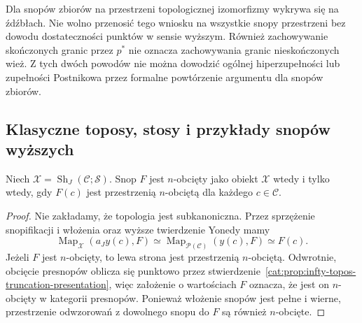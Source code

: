 \begin{uwaga}\label{cat:rem:infty-topos-stalk-caution}
Dla snopów zbiorów na przestrzeni topologicznej izomorfizmy wykrywa się na źdźbłach. Nie wolno przenosić tego wniosku na wszystkie snopy przestrzeni bez dowodu dostateczności punktów w sensie wyższym. Również zachowywanie skończonych granic przez $p^*$ nie oznacza zachowywania granic nieskończonych wież. Z tych dwóch powodów nie można dowodzić ogólnej hiperzupełności lub zupełności Postnikowa przez formalne powtórzenie argumentu dla snopów zbiorów.
\end{uwaga}

\subsection{Klasyczne toposy, stosy i przykłady snopów wyższych}

\begin{stwierdzenie}\label{cat:prop:infty-topos-sheaf-truncated-values}
Niech $\mathcal X=\operatorname{Sh}_J(\mathcal C;\mathcal S)$. Snop $F$ jest $n$-obcięty jako obiekt $\mathcal X$ wtedy i tylko wtedy, gdy $F(c)$ jest przestrzenią $n$-obciętą dla każdego $c\in\mathcal C$.
\end{stwierdzenie}
\begin{proof}
Nie zakładamy, że topologia jest subkanoniczna. Przez sprzężenie snopifikacji i włożenia oraz wyższe twierdzenie Yonedy mamy
\[
 \operatorname{Map}_{\mathcal X}(a_J y(c),F)
 \simeq\operatorname{Map}_{\mathcal P(\mathcal C)}(y(c),F)
 \simeq F(c).
\]
Jeżeli $F$ jest $n$-obcięty, to lewa strona jest przestrzenią $n$-obciętą. Odwrotnie, obcięcie presnopów oblicza się punktowo przez stwierdzenie~\ref{cat:prop:infty-topos-truncation-presentation}, więc założenie o wartościach $F$ oznacza, że jest on $n$-obcięty w kategorii presnopów. Ponieważ włożenie snopów jest pełne i wierne, przestrzenie odwzorowań z dowolnego snopu do $F$ są również $n$-obcięte.
\end{proof}

